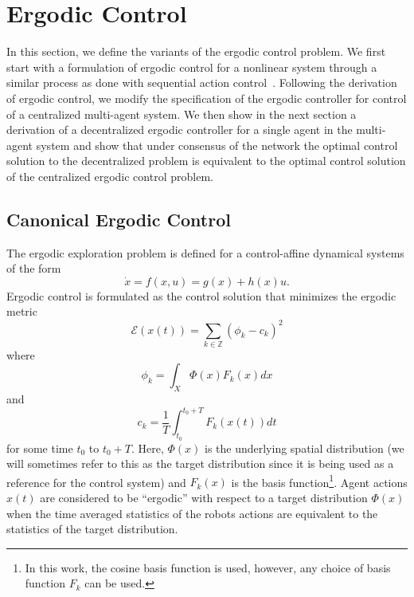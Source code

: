 \documentclass[letterpaper, 10 pt,  conference, twoside]{IEEEtran/IEEEtran}
\theoremstyle{definition}
\begin{document}
\section{Ergodic Control} \label{sec:ergcontrol}

In this section, we define the variants of the ergodic control problem. We first start with a formulation of ergodic control for a nonlinear system through a similar process as done with sequential action control~\cite{ansari2016sequential}. Following the derivation of ergodic control, we modify the specification of the ergodic controller for control of a centralized multi-agent system. We then show in the next section a derivation of a decentralized ergodic controller for a single agent in the multi-agent system and show that under consensus of the network the optimal control solution to the decentralized problem is equivalent to the optimal control solution of the centralized ergodic control problem.

\subsection{Canonical Ergodic Control}
The ergodic exploration problem is defined for a control-affine dynamical systems of the form
\begin{equation} \label{eq:caff}
\dot{x} = f(x,u) = g(x) + h(x) u .
\end{equation}
Ergodic control is formulated as the control solution that minimizes the ergodic metric
\begin{equation}
\mathcal{E}(x(t)) = \sum_{k \in \mathbb{Z}}(\phi_k - c_k)^2
\end{equation}
where
\begin{equation}
\phi_k = \int_X \Phi(x) F_k (x) d x
\end{equation}
and
\begin{equation}
c_k = \frac{1}{T}\int_{t_0}^{t_0 +T} F_k(x(t)) dt
\end{equation} for some time $t_0$ to $t_0+T$.
Here, $\Phi(x)$ is the underlying spatial distribution (we will sometimes refer to this as the target distribution since it is being used as a reference for the control system) and $F_k(x)$ is the basis function\footnote{In this work, the cosine basis function is used, however, any choice of basis function $F_k$ can be used.}. Agent actions $x(t)$ are considered to be ``ergodic'' with respect to a target distribution $\Phi(x)$ when the time averaged statistics of the robots actions are equivalent to the statistics of the target distribution.
\end{document}
